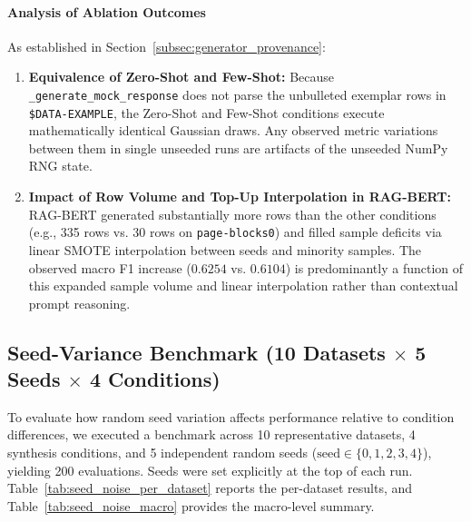 \documentclass[sn-basic]{sn-jnl}
\begin{document}
\paragraph{Analysis of Ablation Outcomes}
As established in Section~\ref{subsec:generator_provenance}:
\begin{enumerate}
    \item \textbf{Equivalence of Zero-Shot and Few-Shot:} Because \texttt{\_generate\_mock\_response} does not parse the unbulleted exemplar rows in \texttt{\$DATA-EXAMPLE}, the Zero-Shot and Few-Shot conditions execute mathematically identical Gaussian draws. Any observed metric variations between them in single unseeded runs are artifacts of the unseeded NumPy RNG state.
    \item \textbf{Impact of Row Volume and Top-Up Interpolation in RAG-BERT:} RAG-BERT generated substantially more rows than the other conditions (e.g., 335 rows vs. 30 rows on \texttt{page-blocks0}) and filled sample deficits via linear SMOTE interpolation between seeds and minority samples. The observed macro F1 increase ($0.6254$ vs. $0.6104$) is predominantly a function of this expanded sample volume and linear interpolation rather than contextual prompt reasoning.
\end{enumerate}

\subsection{Seed-Variance Benchmark (10 Datasets $\times$ 5 Seeds $\times$ 4 Conditions)}
\label{subsec:seed_variance}

To evaluate how random seed variation affects performance relative to condition differences, we executed a benchmark across 10 representative datasets, 4 synthesis conditions, and 5 independent random seeds ($\text{seed} \in \{0, 1, 2, 3, 4\}$), yielding 200 evaluations. Seeds were set explicitly at the top of each run. Table~\ref{tab:seed_noise_per_dataset} reports the per-dataset results, and Table~\ref{tab:seed_noise_macro} provides the macro-level summary.
\end{document}
